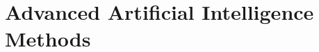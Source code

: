 \documentclass[../../book-en.tex]{subfiles}
\begin{document}
\chapter{Advanced Artificial Intelligence Methods}
\label{ch:2.5-advanced-ai-en}












\end{document}

